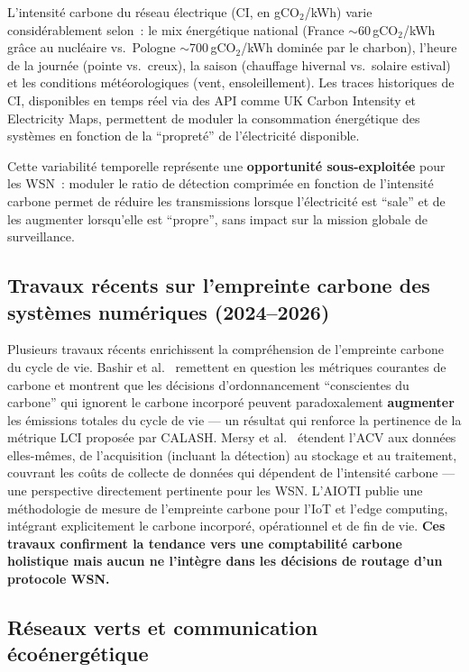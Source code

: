 L'intensité carbone du réseau électrique (CI, en gCO$_2$/kWh) varie considérablement selon~: le mix énergétique national (France $\sim$60\,gCO$_2$/kWh grâce au nucléaire vs.\ Pologne $\sim$700\,gCO$_2$/kWh dominée par le charbon), l'heure de la journée (pointe vs.\ creux), la saison (chauffage hivernal vs.\ solaire estival) et les conditions météorologiques (vent, ensoleillement). Les traces historiques de CI, disponibles en temps réel via des API comme UK Carbon Intensity \cite{uk_carbon_api} et Electricity Maps, permettent de moduler la consommation énergétique des systèmes en fonction de la ``propreté'' de l'électricité disponible.

Cette variabilité temporelle représente une \textbf{opportunité sous-exploitée} pour les WSN~: moduler le ratio de détection comprimée en fonction de l'intensité carbone permet de réduire les transmissions lorsque l'électricité est ``sale'' et de les augmenter lorsqu'elle est ``propre'', sans impact sur la mission globale de surveillance.

\subsection{Travaux récents sur l'empreinte carbone des systèmes numériques (2024--2026)}

Plusieurs travaux récents enrichissent la compréhension de l'empreinte carbone du cycle de vie. Bashir et al.\ \cite{bashir2024sunk} remettent en question les métriques courantes de carbone et montrent que les décisions d'ordonnancement ``conscientes du carbone'' qui ignorent le carbone incorporé peuvent paradoxalement \textbf{augmenter} les émissions totales du cycle de vie --- un résultat qui renforce la pertinence de la métrique LCI proposée par CALASH. Mersy et al.\ \cite{mersy2025lca_data} étendent l'ACV aux données elles-mêmes, de l'acquisition (incluant la détection) au stockage et au traitement, couvrant les coûts de collecte de données qui dépendent de l'intensité carbone --- une perspective directement pertinente pour les WSN. L'AIOTI \cite{aioti2024carbon} publie une méthodologie de mesure de l'empreinte carbone pour l'IoT et l'edge computing, intégrant explicitement le carbone incorporé, opérationnel et de fin de vie. \textbf{Ces travaux confirment la tendance vers une comptabilité carbone holistique mais aucun ne l'intègre dans les décisions de routage d'un protocole WSN.}

\subsection{Réseaux verts et communication écoénergétique}


